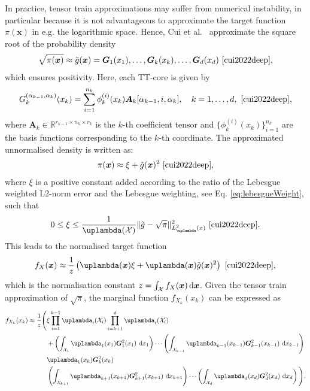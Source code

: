 In practice, tensor train approximations may suffer from numerical instability, in particular because it is not advantageous to approximate the target function $\pi(\bm{x})$ in e.g. the logarithmic space. 
Hence, Cui et al.~\cite{cui2022deep} approximate the square root of the probability density
\begin{align}
	\sqrt{\pi(\bm{x})} \approx \tilde{g}(\bm{x}) = \bm{G}_1(x_1), \dots, \bm{G}_k(x_k), \dots, \bm{G}_d(x_d)\, \,  \text{\cite[Eq. 18]{cui2022deep}},
\end{align}
which ensures positivity.
Here, each TT-core is given by
\begin{equation}
	G^{(\alpha_{k-1},\alpha_k)}_k(x_k) = \sum_{i=1}^{n_k} \phi^{(i)}_k(x_k) \bm{A}_k[\alpha_{k-1}, i, \alpha_k], \quad k = 1, \dots, d,\, \,  \text{\cite[Eq. 21]{cui2022deep}},
\end{equation}
where $\bm{A}_k \in \mathbb{R}^{r_{k-1} \times n_k \times r_k}$ is the $k$-th coefficient tensor and $\{\phi^{(i)}_k(x_k)\}_{i=1}^{n_k}$ are the basis functions corresponding to the $k$-th coordinate.
The approximated unnormalised density is written as:
\begin{align}
	\pi(\bm{x}) \approx \xi + \tilde{g}(\bm{x})^2\, \,  \text{\cite[Eq. 19]{cui2022deep}},
\end{align}
where $\xi$ is a positive constant added according to the ratio of the Lebesgue weighted L2-norm error and the Lebesgue weighting, see Eq. \ref{eq:lebesgueWeight}, such that
\begin{align}
	0 \leq \xi \leq \frac{1}{\uplambda(\mathcal{X})} \lVert \tilde{g} - \sqrt{\pi} \rVert_{L^2_{\uplambda}(x)}^2\, \,  \text{\cite[Eq. 35]{cui2022deep}}. \label{eq:gamErr}
\end{align}
This leads to the normalised target function
\begin{align}
	f_X(\bm{x})  \approx \frac{1}{z} \left( \uplambda(\bm{x}) \xi  + \uplambda(\bm{x}) \tilde{g}(\bm{x})^2 \right)\, \,  \text{\cite[Eq. 19]{cui2022deep}},
\end{align}
which is the normalisation constant $z = \int_{\mathcal{X}} f_X(\bm{x}) \mathop{}\!\mathrm{d} \bm{x} $.
Given the tensor train approximation of $\sqrt{\pi}$, the marginal function $f_{X_k}(x_k)$ can be expressed as
\begin{align}
	\begin{split}
		f_{X_k}(x_k)  \approx \frac{1}{z} \Bigg(&\xi \prod_{i=1}^{k-1} \uplambda_i(\mathcal{X}_i) \prod_{i=k+1}^{d} \uplambda_i(\mathcal{X}_i) \\
		&+ \left( \int_{\mathcal{X}_1} \uplambda_1(x_1) \bm{G}_1^2(x_1)  \, \diff x_1 \right) \cdots 
		\left( \int_{\mathcal{X}_{k-1}} \uplambda_{k-1}(x_{k-1}) \bm{G}_{k-1}^2(x_{k-1}) \, \diff x_{k-1} \right) \\
		& \uplambda_k(x_k) \bm{G}_k^2(x_k)  \\
		&\left( \int_{\mathcal{X}_{k+1}} \uplambda_{k+1}(x_{k+1}) \bm{G}_{k+1}^2(x_{k+1})  \,\diff x_{k+1} \right) \cdots 
		\left( \int_{\mathcal{X}_d} \uplambda_d(x_d) \bm{G}_d^2(x_d)  \, \diff x_d \right) \Bigg).
	\end{split}
\end{align}




